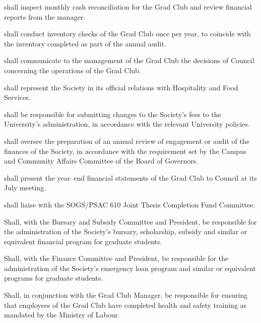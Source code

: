 \begin{longenum}[ label*=\thesubsection.\arabic*., align=left]
    \item shall inspect monthly cash reconciliation for the Grad Club and review financial reports from the manager.
    \item shall conduct inventory checks of the Grad Club once per year, to coincide with the inventory completed as part of the annual audit.
    \item shall communicate to the management of the Grad Club the decisions of Council concerning the operations of the Grad Club.
    \item shall represent the Society in its official relations with Hospitality and Food Services.
    \item shall be responsible for submitting changes to the Society's fees to the University's administration, in accordance with the relevant University policies.
    \item shall oversee the preparation of an annual review of engagement or audit of the finances of the Society, in accordance with the requirement set by the Campus and Community Affairs Committee of the Board of Governors.
    \item shall present the year--end financial statements of the Grad Club to Council at its July meeting. 
    \item shall liaise with the SOGS/PSAC 610 Joint Thesis Completion Fund Committee.
    \item Shall, with the Bursary and Subsidy Committee and President, be responsible for the administration of the Society's bursary, scholarship, subsidy and similar or equivalent financial program for graduate students.
    \item Shall, with the Finance Committee and President, be responsible for the administration of the Society's emergency loan program and similar or equivalent programs for graduate students.
    \item Shall, in conjunction with the Grad Club Manager, be responsible for ensuring that employees of the Grad Club have completed health and safety training as mandated by the Ministry of Labour.

\end{longenum}
